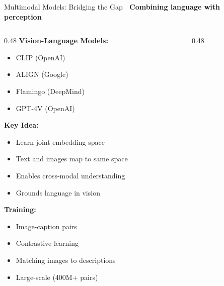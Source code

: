 \documentclass[aspectratio=169]{beamer}
\begin{document}
\begin{frame}[shrink=10]{Multimodal Models: Bridging the Gap 🌉}
\textbf{Combining language with perception}

\vspace{1em}

\begin{columns}[T]
\begin{column}{0.48\textwidth}
\textbf{Vision-Language Models:}
\begin{itemize}\setlength{\itemsep}{0pt}
    \item CLIP (OpenAI)
    \item ALIGN (Google)
    \item Flamingo (DeepMind)
    \item GPT-4V (OpenAI)
\end{itemize}

\vspace{0.5em}
\textbf{Key Idea:}
\begin{itemize}\setlength{\itemsep}{0pt}
    \item Learn joint embedding space
    \item Text and images map to same space
    \item Enables cross-modal understanding
    \item Grounds language in vision
\end{itemize}

\vspace{0.5em}
\textbf{Training:}
\begin{itemize}\setlength{\itemsep}{0pt}
    \item Image-caption pairs
    \item Contrastive learning
    \item Matching images to descriptions
    \item Large-scale (400M+ pairs)
\end{itemize}
\end{column}

\begin{column}{0.48\textwidth}
\begin{center}
\end{center}
\end{column}
\end{columns}
\end{frame}
\end{document}
